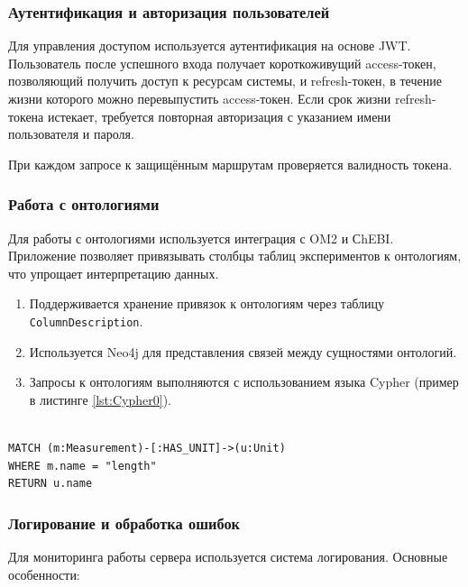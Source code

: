 \subsubsection{Аутентификация и авторизация пользователей}

Для управления доступом используется аутентификация на основе JWT. Пользователь после успешного входа получает короткоживущий access-токен, позволяющий получить доступ к ресурсам системы, и refresh-токен, в течение жизни которого можно перевыпустить access-токен. Если срок жизни refresh-токена истекает, требуется повторная авторизация с указанием имени пользователя и пароля.

При каждом запросе к защищённым маршрутам проверяется валидность токена.

\subsubsection{Работа с онтологиями}

Для работы с онтологиями используется интеграция с OM2 и СhEBI. Приложение позволяет привязывать столбцы таблиц экспериментов к онтологиям, что упрощает интерпретацию данных.

\begin{enumerate}
    \item Поддерживается хранение привязок к онтологиям через таблицу \texttt{ColumnDescription}.
    \item Используется Neo4j для представления связей между сущностями онтологий.
    \item Запросы к онтологиям выполняются с использованием языка Cypher (пример в листинге \ref{lst:Cypher0}).
\end{enumerate}

\begin{lstlisting}[frame=single, basicstyle=\footnotesize\ttfamily, label={lst:Cypher0}, caption={Пример запроса к Neo4j для поиска онтологических связей},captionpos=b, breaklines=true, breakatwhitespace=true]

MATCH (m:Measurement)-[:HAS_UNIT]->(u:Unit)
WHERE m.name = "length"
RETURN u.name
\end{lstlisting}

\subsubsection{Логирование и обработка ошибок}

Для мониторинга работы сервера используется система логирования. Основные особенности:

